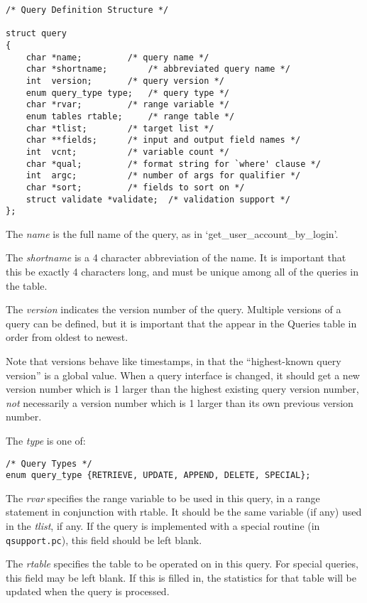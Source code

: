 \begin{verbatim}
/* Query Definition Structure */

struct query
{
    char *name;			/* query name */
    char *shortname;		/* abbreviated query name */
    int  version;		/* query version */
    enum query_type type;	/* query type */
    char *rvar;			/* range variable */
    enum tables rtable;		/* range table */
    char *tlist;		/* target list */
    char **fields;		/* input and output field names */
    int  vcnt;			/* variable count */
    char *qual;			/* format string for `where' clause */
    int  argc;			/* number of args for qualifier */
    char *sort;			/* fields to sort on */
    struct validate *validate;	/* validation support */
};
\end{verbatim}

The {\it name\/} is the full name of the query, as in
`get\_user\_account\_by\_login'.

The {\it shortname\/} is a 4 character abbreviation of the name.  It is
important that this be exactly 4 characters long, and must be unique
among all of the queries in the table.

The {\it version\/} indicates the version number of the query.
Multiple versions of a query can be defined, but it is important that
the appear in the Queries table in order from oldest to newest.

Note that versions behave like timestamps, in that the ``highest-known
query version'' is a global value. When a query interface is changed,
it should get a new version number which is 1 larger than the highest
existing query version number, {\em not\/} necessarily a version
number which is 1 larger than its own previous version number.

The {\it type\/} is one of:

\begin{verbatim}
/* Query Types */
enum query_type {RETRIEVE, UPDATE, APPEND, DELETE, SPECIAL};
\end{verbatim}

The {\it rvar\/} specifies the range variable to be used in this
query, in a range statement in conjunction with rtable. It should be
the same variable (if any) used in the {\it tlist}, if any. If the
query is implemented with a special routine (in {\tt qsupport.pc}),
this field should be left blank.

The {\it rtable\/} specifies the table to be operated on in this
query. For special queries, this field may be left blank. If this is
filled in, the statistics for that table will be updated when the
query is processed.

